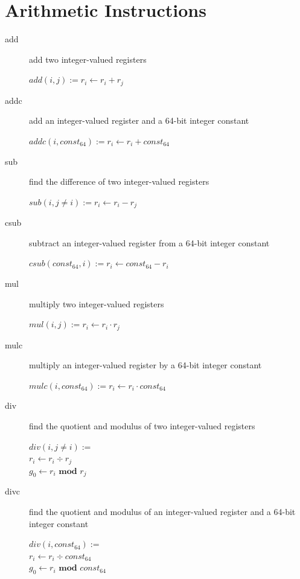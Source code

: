 \documentclass[english,a4paper,12pt]{report}
\begin{document}
\section{Arithmetic Instructions}
\begin{description}
	\item[add] add two integer-valued registers
	
	$add(i, j) := r _{i} \longleftarrow  r _{i} + r_{j} $ \\
	
	\item[addc] add an integer-valued register and a 64-bit integer
	constant
	
	$addc(i, const _{64}) := r _{i} \longleftarrow  r _{i} + const 
	_{64} $ \\
	
	\item[sub] find the difference of two integer-valued registers
	
	$sub(i, j\neq i) := r _{i} \longleftarrow  r _{i} - r _{j} $ \\
	
	\item[csub] subtract an integer-valued register from a 64-bit 
	integer
	constant
	
	$csub(const _{64}, i) := r _{i} \longleftarrow const _{64} - r 
	_{i} $ \\
	
	\item[mul] multiply two integer-valued registers
	
	$mul(i, j) := r _{i} \longleftarrow  r _{i} \cdot r _{j} $ \\
	
	\item[mulc] multiply an integer-valued register by a 64-bit 
	integer
	constant
	
	$mulc(i, const _{64}) := r _{i} \longleftarrow r _{i} \cdot const 
	_{64} $
	
	\item[div] find the quotient and modulus of two integer-valued
	registers
	
	$div(i, j\neq i) :=$ \\
	$ r _{i} \longleftarrow  r _{i} \div r _{j}$ \\
	$ g _{0} \longleftarrow  r _{i} \textbf{ mod } r _{j} $\\
	
	\item[divc] find the quotient and modulus of an integer-valued
	register and a 64-bit integer constant
	
	$div(i, const _{64}) :=$ \\
	$ r _{i} \longleftarrow  r _{i} \div const_{64}$ \\
	$ g _{0} \longleftarrow r _{i} \textbf{ mod } const_{64} $
	
\end{description}
\end{document}
